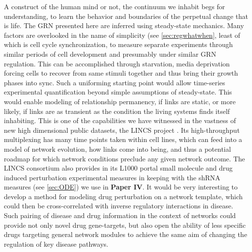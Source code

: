 A construct of the human mind or not, the continuum we inhabit begs for understanding, to learn the behavior and boundaries of the perpetual change that is life. The GRN presented here are inferred using steady-state mechanics. Many factors are overlooked in the name of simplicity (see \cref{sec:regwhatwhen}, least of which is cell cycle synchronization, to measure separate experiments through similar periods of cell development and presumably under similar GRN regulation. This can be accomplished through starvation, \eg media deprivation forcing cells to recover from same stimuli together and thus bring their growth phases into sync. Such a uniforming starting point would allow time-series experimental quantification beyond simple assumptions of steady-state. This would enable modeling of relationship permanency, \ie if links are static, or more likely, if links are as transient as the condition the living systems finds itself inhabiting. This is one of the capabilities we have witnessed in the vastness of new high dimensional public datasets, \eg the LINCS project \cite{subramanian2017next}. Its high-throughput multiplexing has many time points taken within cell lines, which can feed into a model of network evolution, how links come into being, and thus a potential roadmap for which network conditions preclude any given network outcome.
The LINCS consortium also provides in its L1000 portal small molecule and drug induced perturbation experimental measures in keeping with the shRNA measures (see \cref{sec:ODE}) we use in \textbf{Paper IV}. It would be very interesting to develop a method for modeling drug perturbation on a network template, which could then be cross-correlated with inverse regulatory interactions in disease. Such pairing of disease and drug information in the context of networks could provide not only novel drug gene-targets, but also open the ability of less specific drugs targeting general network modules to achieve the same aim of changing the regulation of key disease pathways.


